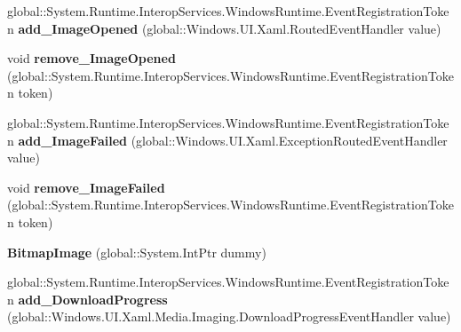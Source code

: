 \begin{DoxyCompactItemize}
\item 
\mbox{\label{class_windows_1_1_u_i_1_1_xaml_1_1_media_1_1_imaging_1_1_bitmap_image_a009137ccb3242294d0b233b43447b15e}} 
global\+::\+System.\+Runtime.\+Interop\+Services.\+Windows\+Runtime.\+Event\+Registration\+Token {\bfseries add\+\_\+\+Image\+Opened} (global\+::\+Windows.\+U\+I.\+Xaml.\+Routed\+Event\+Handler value)
\item 
\mbox{\label{class_windows_1_1_u_i_1_1_xaml_1_1_media_1_1_imaging_1_1_bitmap_image_abd3f6dad75c8f3bd98204092748f8218}} 
void {\bfseries remove\+\_\+\+Image\+Opened} (global\+::\+System.\+Runtime.\+Interop\+Services.\+Windows\+Runtime.\+Event\+Registration\+Token token)
\item 
\mbox{\label{class_windows_1_1_u_i_1_1_xaml_1_1_media_1_1_imaging_1_1_bitmap_image_ada8ed4999b6cb99d62a42b9ebf4c4313}} 
global\+::\+System.\+Runtime.\+Interop\+Services.\+Windows\+Runtime.\+Event\+Registration\+Token {\bfseries add\+\_\+\+Image\+Failed} (global\+::\+Windows.\+U\+I.\+Xaml.\+Exception\+Routed\+Event\+Handler value)
\item 
\mbox{\label{class_windows_1_1_u_i_1_1_xaml_1_1_media_1_1_imaging_1_1_bitmap_image_ab71236e1ec9898c1f9eb8269ae973f2f}} 
void {\bfseries remove\+\_\+\+Image\+Failed} (global\+::\+System.\+Runtime.\+Interop\+Services.\+Windows\+Runtime.\+Event\+Registration\+Token token)
\item 
\mbox{\label{class_windows_1_1_u_i_1_1_xaml_1_1_media_1_1_imaging_1_1_bitmap_image_a44808406b9149bd4c36e0a7b1ab40dc8}} 
{\bfseries Bitmap\+Image} (global\+::\+System.\+Int\+Ptr dummy)
\item 
\mbox{\label{class_windows_1_1_u_i_1_1_xaml_1_1_media_1_1_imaging_1_1_bitmap_image_ad8b669920d50527747f0632426807fbf}} 
global\+::\+System.\+Runtime.\+Interop\+Services.\+Windows\+Runtime.\+Event\+Registration\+Token {\bfseries add\+\_\+\+Download\+Progress} (global\+::\+Windows.\+U\+I.\+Xaml.\+Media.\+Imaging.\+Download\+Progress\+Event\+Handler value)

\end{DoxyCompactItemize}
